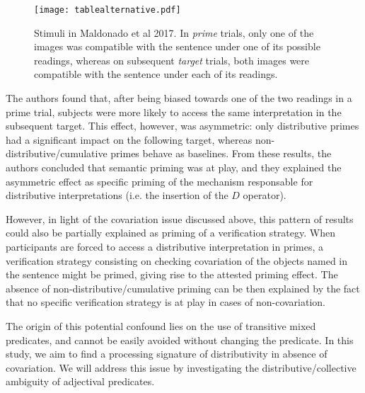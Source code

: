 \documentclass[a4paper, 11pt]{article}
\begin{document}
\begin{figure}[htbp]
\begin{center}
 \texttt{[image: tablealternative.pdf]}
\caption{Stimuli in Maldonado et al 2017. In \emph{prime} trials, only one of the images was compatible with the sentence under one of its possible readings, whereas on subsequent \emph{target} trials, both images were compatible with the sentence under each of its readings.}
\label{fig:example.maldonado2017}
\end{center}
\end{figure}

The authors found that, after being biased towards one of the two readings in a prime trial, subjects were more likely to access the same interpretation in the subsequent target. This effect, however, was asymmetric: only distributive primes had a significant impact on the following target, whereas non-distributive/cumulative primes behave as baselines. From these results, the authors concluded that semantic priming was at play, and they explained the asymmetric effect as specific priming of the mechanism responsable for distributive interpretations (i.e. the insertion of the $D$ operator).

However, in light of the covariation issue discussed above, this pattern of results could also be partially explained as priming of a verification strategy. When participants are forced to access a distributive interpretation in primes, a verification strategy consisting on checking covariation of the objects named in the sentence might be primed, giving rise to the attested priming effect. The absence of non-distributive/cumulative priming can be then explained by the fact that no specific verification strategy is at play in cases of non-covariation. 

The origin of this potential confound lies on the use of transitive mixed predicates, and cannot be easily avoided without changing the predicate. In this study, we aim to find a processing signature of distributivity in absence of covariation. We will address this issue by investigating the distributive/collective ambiguity of adjectival predicates. 
\end{document}
